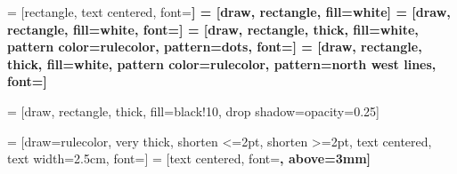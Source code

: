    = [rectangle, text centered, font=\sffamily\footnotesize\bfseries]
    = [draw, rectangle, fill=white]
  = [draw, rectangle, fill=white, font=\sffamily\footnotesize]
    = [draw, rectangle, thick, fill=white, pattern color=rulecolor, pattern=dots, font=\sffamily\small]
   = [draw, rectangle, thick, fill=white, pattern color=rulecolor, pattern=north west lines, font=\sffamily\small]

   = [draw, rectangle, thick, fill=black!10, drop shadow={opacity=0.25}]

 = [draw=rulecolor, very thick, shorten <=2pt, shorten >=2pt, 
  text centered, text width=2.5cm, font=\footnotesize]
 = [text centered, font=\sffamily\footnotesize\bfseries, above=3mm]

